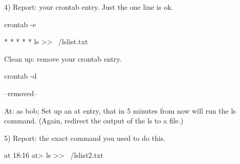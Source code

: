 4) Report: your crontab entry. Just the one line is ok.

crontab -e

* * * * * ls >> ~/lslist.txt

Clean up: remove your crontab entry.

crontab -d 

--removed--

At: as bob; Set up an at entry, that in 5 minutes from now will
run the {\ltt{}ls} command.
(Again, redirect the output of the {\ltt{}ls} to a file.) 

5) Report: the exact command you used to do this.

at 18:16
at> ls >> ~/lslist2.txt 

\bye
